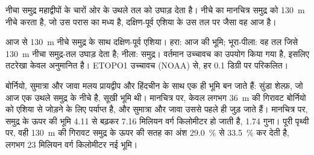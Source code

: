 नीचा समुद्र महाद्वीपों के चारों ओर के उथले तल को उघाड़ देता है। नीचे का मानचित्र
समुद्र को \qty{130}{m} नीचे करता है, जो उस परास का मध्य है, दक्षिण-पूर्व एशिया के
उस तल पर जैसा वह आज है।

\begin{omfigure}

{\small आज से \qty{130}{m} नीचे समुद्र के साथ दक्षिण-पूर्व एशिया। हरा:
आज की भूमि; भूरा-पीला: वह तल जिसे \qty{130}{m} नीचा समुद्र-तल उघाड़ देता है; नीला:
समुद्र। वर्तमान उच्चावच का उपयोग किया गया है, इसलिए तटरेखा केवल अनुमानित है।
ETOPO1 उच्चावच (NOAA) से, हर 0.1 डिग्री पर परिकलित।}
\end{omfigure}

बोर्नियो, सुमात्रा और जावा मलय प्रायद्वीप और
हिंदचीन के साथ एक ही भूमि बन जाते हैं: सुंडा शेल्फ़, जो आज एक उथले समुद्र के नीचे है, सूखी भूमि थी। मानचित्र पर,
केवल लगभग \qty{36}{m} की गिरावट बोर्नियो को एशिया से जोड़ने के लिए पर्याप्त है, और सुमात्रा और
जावा उससे पहले ही जुड़ जाते हैं। मानचित्र पर,
समुद्र के ऊपर की भूमि 4.11 से बढ़कर 7.16 मिलियन वर्ग किलोमीटर हो जाती है,
1.74 गुना। पूरी पृथ्वी पर, वही \qty{130}{m} की गिरावट
समुद्र के ऊपर की सतह का अंश \qty{29.0}{\percent} से
\qty{33.5}{\percent} कर देती है, लगभग 23 मिलियन वर्ग किलोमीटर नई भूमि।

